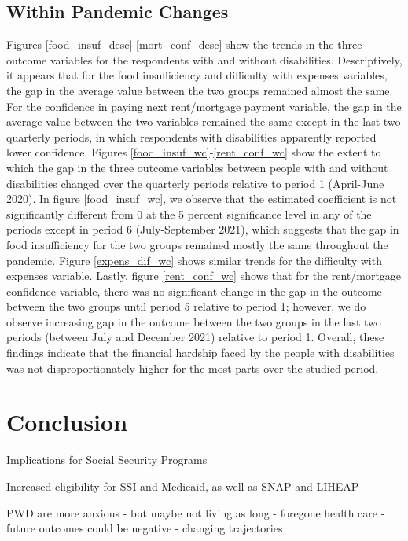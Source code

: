 \documentclass[12pt]{article}
\begin{document}
\subsection{Within Pandemic Changes}

Figures \ref{food_insuf_desc}-\ref{mort_conf_desc} show the trends in the three outcome variables for the respondents with and without disabilities. Descriptively, it appears that for the food insufficiency and difficulty with expenses variables, the gap in the average value between the two groups remained almost the same. For the confidence in paying next rent/mortgage payment variable, the gap in the average value between the two variables remained the same except in the last two quarterly periods, in which respondents with disabilities apparently reported lower confidence. Figures \ref{food_insuf_wc}-\ref{rent_conf_wc} show the extent to which the gap in the three outcome variables between people with and without disabilities changed over the quarterly periods relative to period 1 (April-June 2020). In figure \ref{food_insuf_wc}, we observe that the estimated coefficient is not significantly different from 0 at the 5 percent significance level in any of the periods except in period 6 (July-September 2021), which suggests that the gap in food insufficiency for the two groups remained mostly the same throughout the pandemic. Figure \ref{expens_dif_wc} shows similar trends for the difficulty with expenses variable. Lastly,  figure \ref{rent_conf_wc} shows that for the rent/mortgage confidence variable, there was no significant change in the gap in the outcome between the two groups until period 5 relative to period 1; however, we do observe increasing gap in the outcome between the two groups in the last two periods (between July and December 2021) relative to period 1. Overall, these findings indicate that the financial hardship faced by the people with disabilities was not disproportionately higher for the most parts over the studied period. 

\section{Conclusion}
 
Implications for Social Security Programs
 
Increased eligibility for SSI and Medicaid, as well as SNAP and LIHEAP

PWD are more anxious  - but maybe not living as long - foregone health care - future outcomes could be negative - changing trajectories
\end{document}
